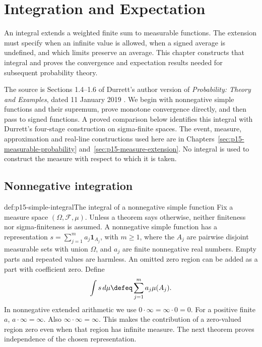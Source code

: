 \chapter{Integration and Expectation}
\label{sec:p15-integration-expectation}

An integral extends a weighted finite sum to measurable functions. The
extension must specify when an infinite value is allowed, when a signed
average is undefined, and which limits preserve an average. This chapter
constructs that integral and proves the convergence and expectation results
needed for subsequent probability theory.

The source is Sections 1.4--1.6 of Durrett's author version of
\emph{Probability: Theory and Examples}, dated 11 January 2019
\cite[pp.~18--37]{DurrettPTEAuthor2019}. We begin with nonnegative simple
functions and their supremum, prove monotone convergence directly, and
then pass to signed functions. A proved comparison below identifies this
integral with Durrett's four-stage construction on sigma-finite spaces.
The event, measure, approximation and real-line constructions used here
are in Chapters~\ref{sec:p15-measurable-probability}
and~\ref{sec:p15-measure-extension}. No integral is used to construct
the measure with respect to which it is taken.

\section{Nonnegative integration}
\label{sec:p15-nonnegative-integral}

\begin{hbdefinition}{def:p15-simple-integral}{The integral of a nonnegative simple function}
Fix a measure space \((\Omega,\mathcal F,\mu)\). Unless a theorem
says otherwise, neither finiteness nor sigma-finiteness is assumed.
A nonnegative simple function has a representation
\(s=\sum_{j=1}^m a_j\mathbf1_{A_j}\), with \(m\geq1\), where the
\(A_j\) are pairwise disjoint measurable sets with union \(\Omega\),
and \(a_j\) are finite
nonnegative real numbers. Empty parts and repeated values are harmless.
An omitted zero region can be added as a part with coefficient zero.
Define
\[
 \int s\,d\mu\defeq\sum_{j=1}^m a_j\mu(A_j).
\]
In nonnegative extended arithmetic we use \(0\cdot\infty=\infty\cdot0=0\).
For a positive finite \(a\), \(a\cdot\infty=\infty\).
Also \(\infty\cdot\infty=\infty\).
This makes the contribution of a zero-valued region zero even when that
region has infinite measure. The next theorem proves independence of
the chosen representation.
\end{hbdefinition}

